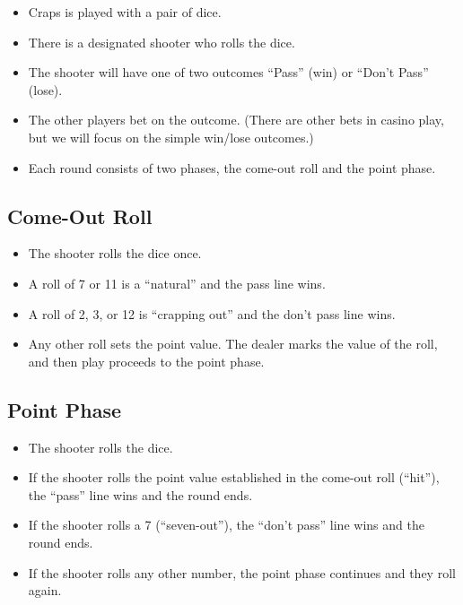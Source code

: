 \documentclass{article}
\begin{document}
\begin{itemize}
    \item Craps is played with a pair of dice.
    \item There is a designated shooter who rolls the dice.
    \item The shooter will have one of two outcomes ``Pass'' (win) or
        ``Don't Pass'' (lose).
    \item The other players bet on the outcome. (There are other bets
        in casino play, but we will focus on the simple win/lose outcomes.)
    \item Each round consists of two phases, the come-out roll and the
        point phase.
\end{itemize}

\subsection{Come-Out Roll}
\begin{itemize}
    \item The shooter rolls the dice once.
    \item A roll of 7 or 11 is a ``natural'' and the pass
        line wins.
    \item A roll of 2, 3, or 12 is ``crapping out'' and the don't
        pass line wins.
    \item Any other roll sets the point value.  The dealer marks the
        value of the roll, and then play proceeds to the point phase.
\end{itemize}

\subsection{Point Phase}
\begin{itemize}
    \item The shooter rolls the dice.
    \item If the shooter rolls the point value established in the
        come-out roll (``hit''), the ``pass'' line wins and the round ends.
    \item If the shooter rolls a 7 (``seven-out''), the ``don't pass'' line wins and
        the round ends.
    \item If the shooter rolls any other number, the point phase
        continues and they roll again.
\end{itemize}
\end{document}
